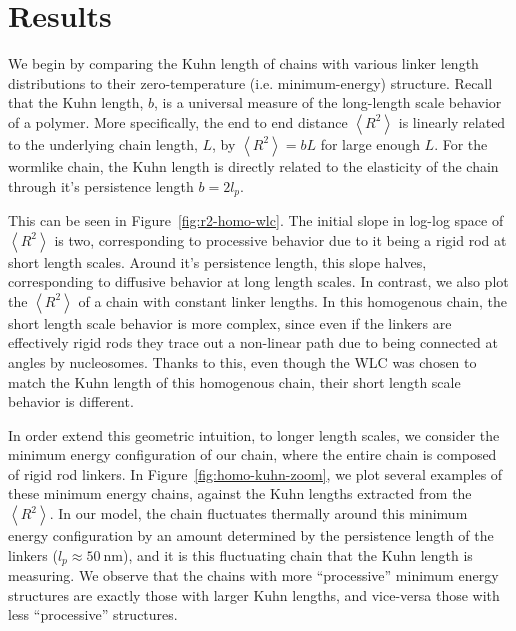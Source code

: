 \documentclass[%
 reprint,
superscriptaddress,
showpacs,preprintnumbers,
 amsmath,amssymb,
 aps,
 prl,
]{revtex4-1}
\newcommand{\RR}{\left\langle{}R^2\right\rangle{}}
\begin{document}
\section{\label{sec:results}Results}
We begin by comparing the Kuhn length of chains with various linker length
    distributions to their zero-temperature (i.e. minimum-energy) structure.
Recall that the Kuhn length, $b$, is a universal measure of the long-length
    scale behavior of a polymer.
More specifically, the end to end distance $\RR$ is linearly related to the
    underlying chain length, $L$, by $\RR = bL$ for large enough $L$.
For the wormlike chain, the Kuhn length is directly related to the elasticity of
    the chain through it's persistence length $b = 2l_p$.

This can be seen in Figure~\ref{fig:r2-homo-wlc}. The initial slope in log-log
    space of $\RR$ is two, corresponding to processive behavior due to it being
    a rigid rod at short length scales.
Around it's persistence length, this slope halves, corresponding to diffusive
    behavior at long length scales.
In contrast, we also plot the $\RR$ of a chain with constant linker lengths.
In this homogenous chain, the short length scale behavior is more complex, since
    even if the linkers are effectively rigid rods they trace out a non-linear
    path due to being connected at angles by nucleosomes.
Thanks to this, even though the WLC was chosen to match the Kuhn length of this homogenous
    chain, their short length scale behavior is different.

In order extend this geometric intuition, to longer length scales, we consider
    the minimum energy configuration of our chain, where the entire chain
    is composed of rigid rod linkers.
In Figure~\ref{fig:homo-kuhn-zoom}, we plot several examples of these minimum
    energy chains, against the Kuhn lengths extracted from the $\RR$.
In our model, the chain fluctuates thermally around this minimum energy
    configuration by an amount determined by the persistence length of the
    linkers ($l_p \approx \SI{50}{\nano\metre}$), and it is this fluctuating
    chain that the Kuhn length is measuring.
We observe that the chains with more ``processive'' minimum energy structures
    are exactly those with larger Kuhn lengths, and vice-versa those with less
    ``processive'' structures.
\end{document}
